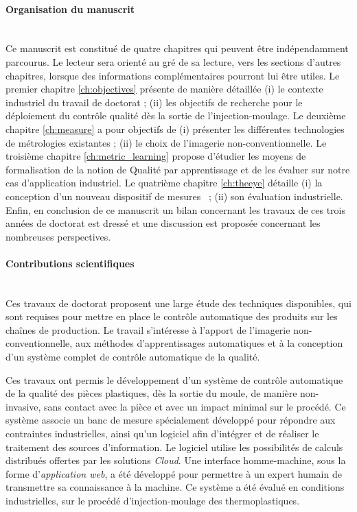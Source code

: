 
\bigskip
\paragraph{Organisation du manuscrit}\mbox{} \\

Ce manuscrit est constitué de quatre chapitres qui peuvent être indépendamment parcourus.
Le lecteur sera orienté au gré de sa lecture, vers les sections d'autres chapitres, lorsque des informations complémentaires pourront lui être utiles.
Le premier chapitre \ref{ch:objectives} présente de manière détaillée (i) le contexte industriel du travail de doctorat ; (ii) les objectifs de recherche pour le déploiement du contrôle qualité dès la sortie de l'injection-moulage.
Le deuxième chapitre \ref{ch:measure} a pour objectifs de (i) présenter les différentes technologies de métrologies existantes ; (ii) le choix de l'imagerie non-conventionnelle.
Le troisième chapitre \ref{ch:metric_learning} propose d'étudier les moyens de formalisation de la notion de Qualité par apprentissage et de les évaluer sur notre cas d'application industriel.
Le quatrième chapitre \ref{ch:theeye} détaille (i) la conception d'un nouveau dispositif de mesures \ ; (ii) son évaluation industrielle.
Enfin, en conclusion de ce manuscrit un bilan concernant les travaux de ces trois années de doctorat est dressé et une discussion est proposée concernant les nombreuses perspectives.

\bigskip
\paragraph{Contributions scientifiques}\mbox{} \\
Ces travaux de doctorat proposent une large étude des techniques disponibles, qui sont requises pour mettre en place le contrôle automatique des produits sur les chaînes de production.
Le travail s'intéresse à l'apport de l'imagerie non-conventionnelle, aux méthodes d'apprentissages automatiques et à la conception d'un système complet de contrôle automatique de la qualité.

Ces travaux ont permis le développement d'un système de contrôle automatique de la qualité des pièces plastiques, dès la sortie du moule, de manière non-invasive, sans contact avec la pièce et avec un impact minimal sur le procédé.
Ce système associe un banc de mesure spécialement développé pour répondre aux contraintes industrielles, ainsi qu'un logiciel afin d'intégrer et de réaliser le traitement des sources d'information.
Le logiciel utilise les possibilités de calculs distribués offertes par les solutions \textit{Cloud}.
Une interface homme-machine, sous la forme d'\textit{application web}, a été développé pour permettre à un expert humain de transmettre sa connaissance à la machine.
Ce système a été évalué en conditions industrielles, sur le procédé d'injection-moulage des thermoplastiques.

